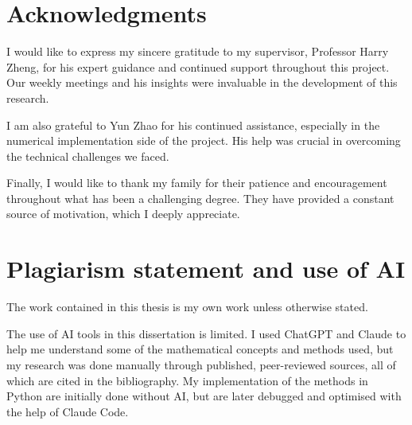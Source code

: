 \documentclass[a4paper,11pt, twoside]{report}
\theoremstyle{definition}
\theoremstyle{plain}
\theoremstyle{remark}
\begin{document}


\begin{abstract}
    American option pricing requires solving free boundary PDEs with no closed-form solution. We reformulate the problem as a variational inequality and propose a physics-informed neural network (PINN) approach to solve it. On both the Black-Scholes and Heston models, our PINNs match tree-based benchmarks to $3\%$ relative error. We extend the approach to multi-asset settings where we benchmark against equivalent one-dimensional reductions. We characterise the free boundary from the learned solution, yielding interpretable early-exercise surfaces. The results establish PINNs as a practical alternative to lattice methods for higher-dimensional problems in financial mathematics.
\end{abstract}
 
\clearpage
\section*{Acknowledgments}
I would like to express my sincere gratitude to my supervisor, Professor Harry Zheng, for his expert guidance and continued support throughout this project. Our weekly meetings and his insights were invaluable in the development of this research.

I am also grateful to Yun Zhao for his continued assistance, especially in the numerical implementation side of the project. His help was crucial in overcoming the technical challenges we faced.

Finally, I would like to thank my family for their patience and encouragement throughout what has been a challenging degree. They have provided a constant source of motivation, which I deeply appreciate.
\clearpage

\clearpage
\section*{Plagiarism statement and use of AI}
The work contained in this thesis is my own work unless otherwise stated.

The use of AI tools in this dissertation is limited. I used ChatGPT and Claude to help me understand some of the mathematical concepts and methods used, but my research was done manually through published, peer-reviewed sources, all of which are cited in the bibliography. My implementation of the methods in Python are initially done without AI, but are later debugged and optimised with the help of Claude Code.
\\
\end{document}
